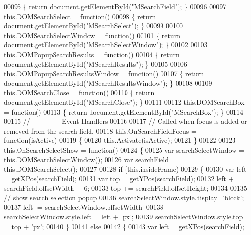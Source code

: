 \begin{DoxyCode}
00095   \{  \textcolor{keywordflow}{return} document.getElementById(\textcolor{stringliteral}{"MSearchField"});  \}
00096 
00097   this.DOMSearchSelect = \textcolor{keyword}{function}()
00098   \{  \textcolor{keywordflow}{return} document.getElementById(\textcolor{stringliteral}{"MSearchSelect"});  \}
00099 
00100   this.DOMSearchSelectWindow = \textcolor{keyword}{function}()
00101   \{  \textcolor{keywordflow}{return} document.getElementById(\textcolor{stringliteral}{"MSearchSelectWindow"});  \}
00102 
00103   this.DOMPopupSearchResults = \textcolor{keyword}{function}()
00104   \{  \textcolor{keywordflow}{return} document.getElementById(\textcolor{stringliteral}{"MSearchResults"});  \}
00105 
00106   this.DOMPopupSearchResultsWindow = \textcolor{keyword}{function}()
00107   \{  \textcolor{keywordflow}{return} document.getElementById(\textcolor{stringliteral}{"MSearchResultsWindow"});  \}
00108 
00109   this.DOMSearchClose = \textcolor{keyword}{function}()
00110   \{  \textcolor{keywordflow}{return} document.getElementById(\textcolor{stringliteral}{"MSearchClose"}); \}
00111 
00112   this.DOMSearchBox = \textcolor{keyword}{function}()
00113   \{  \textcolor{keywordflow}{return} document.getElementById(\textcolor{stringliteral}{"MSearchBox"});  \}
00114 
00115   \textcolor{comment}{// ------------ Event Handlers}
00116 
00117   \textcolor{comment}{// Called when focus is added or removed from the search field.}
00118   this.OnSearchFieldFocus = \textcolor{keyword}{function}(isActive)
00119   \{
00120     this.Activate(isActive);
00121   \}
00122 
00123   this.OnSearchSelectShow = \textcolor{keyword}{function}()
00124   \{
00125     var searchSelectWindow = this.DOMSearchSelectWindow();
00126     var searchField        = this.DOMSearchSelect();
00127 
00128     \textcolor{keywordflow}{if} (this.insideFrame)
00129     \{
00130       var left = \hyperlink{search_8js_a76d24aea0009f892f8ccc31d941c0a2b}{getXPos}(searchField);
00131       var top  = \hyperlink{search_8js_a8d7b405228661d7b6216b6925d2b8a69}{getYPos}(searchField);
00132       left += searchField.offsetWidth + 6;
00133       top += searchField.offsetHeight;
00134 
00135       \textcolor{comment}{// show search selection popup}
00136       searchSelectWindow.style.display=\textcolor{stringliteral}{'block'};
00137       left -= searchSelectWindow.offsetWidth;
00138       searchSelectWindow.style.left =  left + \textcolor{stringliteral}{'px'};
00139       searchSelectWindow.style.top  =  top  + \textcolor{stringliteral}{'px'};
00140     \}
00141     \textcolor{keywordflow}{else}
00142     \{
00143       var left = \hyperlink{search_8js_a76d24aea0009f892f8ccc31d941c0a2b}{getXPos}(searchField);

\end{DoxyCode}

